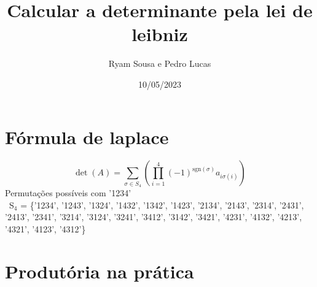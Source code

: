 \documentclass{article}
\title{Calcular a determinante pela lei de leibniz}
\author{Ryam Sousa e Pedro Lucas}
\date{10/05/2023}
\begin{document}
    \maketitle
    \section{Fórmula de laplace}
    
    
    \[
    \det(A) = \sum_{\sigma \in S_4} \left( \prod_{i=1}^{4} (-1)^{\mathrm{sgn}(\sigma)} a_{i\sigma(i)} \right)
    \] \newline
    Permutações possíveis com '1234'\newline\\
    \ {S}$_4$ = \{'1234', '1243', '1324', '1432', '1342', '1423', 
    '2134', '2143', '2314', '2431', '2413', '2341', 
    '3214', '3124', '3241', '3412', '3142', '3421', 
    '4231', '4132', '4213', '4321', '4123', '4312'\} \newline
    
    \section{Produtória na prática}
    
\end{document}
